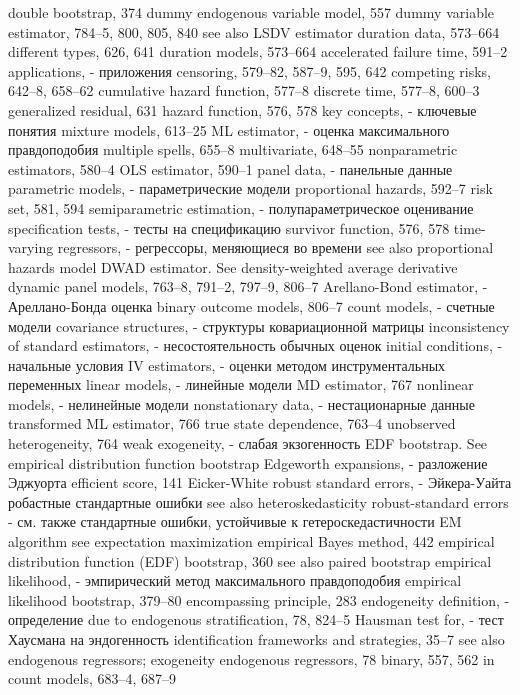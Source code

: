 double bootstrap, 374
dummy endogenous variable model, 557 dummy variable estimator, 784–5, 800, 805, 840
see also LSDV estimator duration data, 573–664
different types, 626, 641 duration models, 573–664
accelerated failure time, 591–2
applications, - приложения
censoring, 579–82, 587–9, 595, 642 competing risks, 642–8, 658–62
cumulative hazard function, 577–8 discrete time, 577–8, 600–3 generalized residual, 631
hazard function, 576, 578
key concepts, - ключевые понятия
mixture models, 613–25
ML estimator, - оценка максимального правдоподобия
multiple spells, 655–8 multivariate, 648–55 nonparametric estimators, 580–4 OLS estimator, 590–1
panel data, - панельные данные
parametric models, - параметрические модели
proportional hazards, 592–7
risk set, 581, 594
semiparametric estimation, - полупараметрическое оценивание 
specification tests, - тесты на спецификацию
survivor function, 576, 578
time-varying regressors, - регрессоры, меняющиеся во времени
see also proportional hazards model
DWAD estimator. See density-weighted average derivative
dynamic panel models, 763–8, 791–2, 797–9, 806–7
Arellano-Bond estimator, - Ареллано-Бонда оценка
binary outcome models, 806–7
count models, - счетные модели
covariance structures, - структуры ковариационной матрицы
inconsistency of standard estimators, - несостоятельность обычных оценок 
initial conditions, - начальные условия
IV estimators, - оценки методом инструментальных переменных
linear models, - линейные модели
MD estimator, 767
nonlinear models, - нелинейные модели 
nonstationary data, - нестационарные данные
transformed ML estimator, 766 true state dependence, 763–4 unobserved heterogeneity, 764 
weak exogeneity, - слабая экзогенность
EDF bootstrap. See empirical distribution function bootstrap
Edgeworth expansions, - разложение Эджуорта
efficient score, 141
Eicker-White robust standard errors, - Эйкера-Уайта робастные стандартные ошибки 
see also heteroskedasticity robust-standard errors - см. также стандартные ошибки, устойчивые к гетероскедастичности
EM algorithm see expectation maximization empirical Bayes method, 442
empirical distribution function (EDF) bootstrap, 360
see also paired bootstrap
empirical likelihood, - эмпирический метод максимального правдоподобия
empirical likelihood bootstrap, 379–80 encompassing principle, 283 endogeneity
definition, - определение
due to endogenous stratification, 78, 824–5 
Hausman test for,  - тест Хаусмана на эндогенность
identification frameworks and strategies, 35–7
see also endogenous regressors; exogeneity endogenous regressors, 78
binary, 557, 562
in count models, 683–4, 687–9
